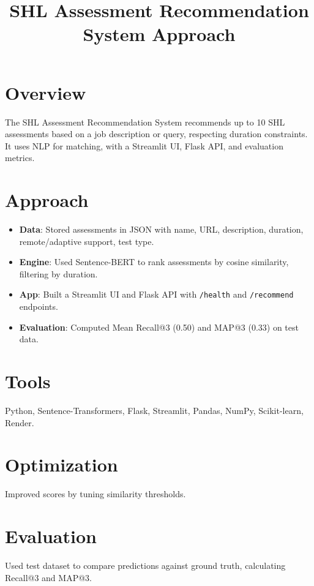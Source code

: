 \documentclass[a4paper,11pt]{article}
\begin{document}
\title{SHL Assessment Recommendation System Approach}
\author{}
\date{}
\maketitle

\section*{Overview}
The SHL Assessment Recommendation System recommends up to 10 SHL assessments based on a job description or query, respecting duration constraints. It uses NLP for matching, with a Streamlit UI, Flask API, and evaluation metrics.

\section*{Approach}
\begin{itemize}
    \item \textbf{Data}: Stored assessments in JSON with name, URL, description, duration, remote/adaptive support, test type.
    \item \textbf{Engine}: Used Sentence-BERT to rank assessments by cosine similarity, filtering by duration.
    \item \textbf{App}: Built a Streamlit UI and Flask API with \texttt{/health} and \texttt{/recommend} endpoints.
    \item \textbf{Evaluation}: Computed Mean Recall@3 (0.50) and MAP@3 (0.33) on test data.
\end{itemize}

\section*{Tools}
Python, Sentence-Transformers, Flask, Streamlit, Pandas, NumPy, Scikit-learn, Render.

\section*{Optimization}
Improved scores by tuning similarity thresholds.

\section*{Evaluation}
Used test dataset to compare predictions against ground truth, calculating Recall@3 and MAP@3.
\end{document}
